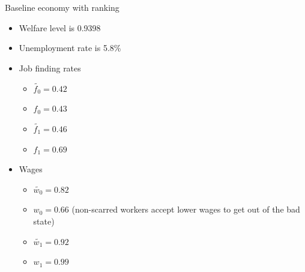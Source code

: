 \documentclass[9pt,xcolor={svgnames}]{beamer}
\begin{document}
\begin{frame}{Baseline economy with ranking}
\begin{itemize}
\setlength\itemsep{1.5em}

\item Welfare level is 0.9398

\item Unemployment rate is 5.8\%
    
    \item Job finding rates
    \smallskip
    \begin{itemize}
        \item $\tilde{f_{0}} = 0.42$ 
        \item $f_{0} = 0.43$
        \item $\tilde{f_{1}} = 0.46$ 
        \item $f_{1} = 0.69$
    \end{itemize}

    \item Wages
    \smallskip
    \begin{itemize}
        \item $\tilde{w_{0}} = 0.82$ 
        \item $w_{0} = 0.66$ (non-scarred workers accept lower wages to get out of the bad state)
        \item $\tilde{w_{1}} = 0.92$ 
        \item $w_{1} = 0.99$
    \end{itemize}
        
\end{itemize}
 
\end{frame}
\end{document}

